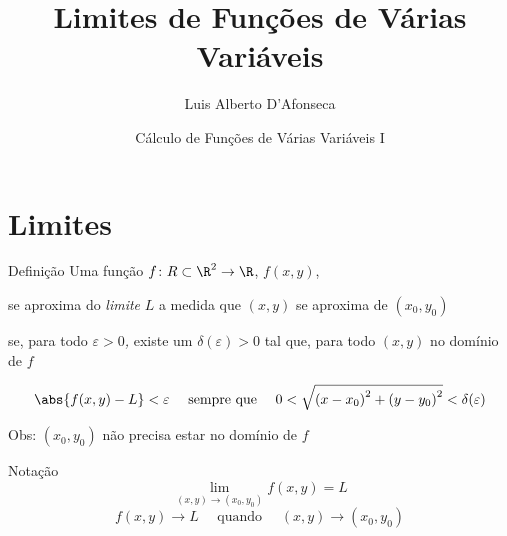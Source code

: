 
\usepackage{apresentacao}
\usepackage{mathconfig}
\usepackage{tabto}

\setlength{\parskip}{0.5\baselineskip}

\setcounter{exemplo}{0}

\makeatletter
\graphicspath  {{./figs/}}
\makeatother

\title {Limites de Funções de Várias Variáveis}
\author{\large Luis Alberto D'Afonseca}
\date  {Cálculo de Funções de Várias Variáveis I}



\begin{frame}
    \titlepage
\end{frame}

\section{Limites}

\begin{frame}{Definição}
  Uma função
  \(f\colon R \subset \R^2 \to \R\), \;
  \pause
  \(f(x, y)\),

  \pause
  se aproxima do \emph{limite} $L$
  a medida que \((x, y)\) se aproxima de \((x_0, y_0)\)

  \pause
  se, para todo \emph{$\varepsilon>0$,}
  \pause
  existe um \emph{\(\delta(\varepsilon)>0\)}
  \pause
  tal que,
  \pause
  para todo \((x, y)\) no domínio de $f$

  \pause
  \[
    \abs{f(x, y)-L} < \varepsilon
    \quad\text{ sempre que }\quad
    0 < \sqrt{ \left(x-x_0\right)^2 + \left(y-y_0\right)^2 } < \delta(\varepsilon)
  \]

  \pause
  Obs: \((x_0, y_0)\) não precisa estar no domínio de $f$
\end{frame}

\begin{frame}{Notação}
  \[
    \lim_{(x, y)\to(x_0, y_0)} f(x, y) = L
  \]
  \pause
  \vspace{\baselineskip}
  \[
    f(x, y) \to L \quad\text{ quando }\quad (x, y)\to(x_0, y_0)
  \]
\end{frame}


